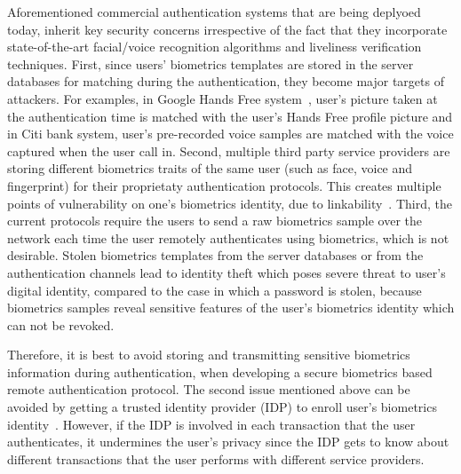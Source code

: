 \documentclass[10pt]{article}
\begin{document}
Aforementioned commercial authentication systems that are being deplyoed today, inherit key security 
concerns irrespective of the fact that they incorporate state-of-the-art facial/voice recognition algorithms and liveliness verification techniques. 
First, since users' biometrics templates are stored in the server databases for matching during the authentication, they become major targets 
of attackers.
For examples, in Google Hands Free system~\cite{google}, user's picture taken at the authentication time is matched with the user's Hands Free 
profile picture and in Citi bank system, user's pre-recorded voice samples are matched with the voice captured when the user call in. Second, 
multiple third party service providers are storing different biometrics traits of the same user (such as face, voice and fingerprint) for their 
proprietaty authentication protocols. This creates multiple points of vulnerability on one's biometrics identity, due to 
linkability~\cite{linkability}. Third, the current protocols require the users to send a raw biometrics sample over the network each time the user 
remotely authenticates using biometrics, which is not desirable.
Stolen biometrics templates from the server databases or from the authentication channels lead to identity theft which poses severe threat to user's 
digital identity, compared to the case in which a password is stolen, because biometrics samples reveal sensitive features of the user's 
biometrics identity which can not be revoked.

Therefore, it is best to avoid storing and transmitting sensitive biometrics information during authentication, when developing a secure biometrics 
based remote authentication protocol.
The second issue mentioned above can be avoided by getting a trusted identity provider (IDP) to enroll user's biometrics identity~\cite{google, 
identityX}. However, if the IDP is involved in each transaction that the user authenticates, it undermines the user's privacy since the IDP gets to 
know about different transactions that the user performs with different service providers.
  
\end{document}
